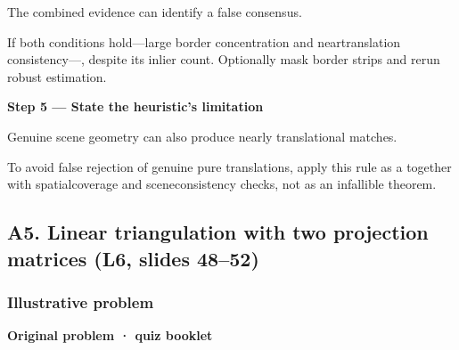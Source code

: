 \documentclass[letterpaper,11pt,english,openany,oneside]{jupyterBook}
\begin{document}
\sphinxAtStartPar
{} The combined evidence can identify a false consensus.

\sphinxAtStartPar
If both conditions hold—large border concentration and near\sphinxhyphen{}translation consistency—, despite its inlier count. Optionally mask border strips and rerun robust estimation.

\par

\par\medskip{}
{\color{QuizStepRed}\bfseries Step 5 — State the heuristic's limitation}\par\smallskip

\sphinxAtStartPar
{} Genuine scene geometry can also produce nearly translational matches.

\sphinxAtStartPar
To avoid false rejection of genuine pure translations, apply this rule as a  together with spatial\sphinxhyphen{}coverage and scene\sphinxhyphen{}consistency checks, not as an infallible theorem.

\par


\subsection{A5. Linear triangulation with two projection matrices (L6, slides 48–52)}
\label{\detokenize{lectures/lecture06/quiz-workbook:a5-linear-triangulation-with-two-projection-matrices-l6-slides-4852}}\label{\detokenize{lectures/lecture06/quiz-workbook:quiz-source-a5}}
\sphinxAtStartPar
{}


\subsubsection{Illustrative problem}
\label{\detokenize{lectures/lecture06/quiz-workbook:illustrative-problem}}\label{\detokenize{lectures/lecture06/quiz-workbook:quiz-a5-q1}}
\par\medskip\textbf{Original problem · quiz booklet}\par\smallskip
\end{document}
